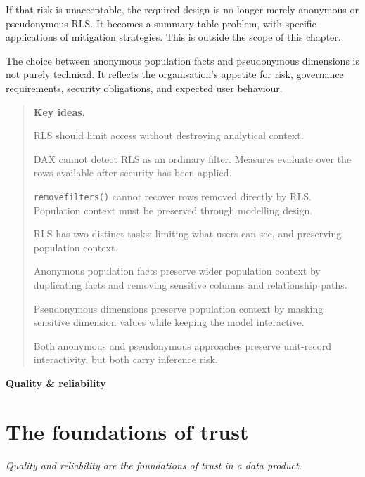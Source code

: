\documentclass[10pt,openany,10pt]{book}
\begin{document}
If that risk is unacceptable, the required design is no longer merely
anonymous or pseudonymous RLS. It becomes a summary-table problem, with
specific applications of mitigation strategies. This is outside the
scope of this chapter.

The choice between anonymous population facts and pseudonymous
dimensions is not purely technical. It reflects the organisation's
appetite for risk, governance requirements, security obligations, and
expected user behaviour.

\begin{quote}
\textbf{Key ideas.}

RLS should limit access without destroying analytical context.

DAX cannot detect RLS as an ordinary filter. Measures evaluate over the
rows available after security has been applied.

\texttt{removefilters()} cannot recover rows removed directly by RLS.
Population context must be preserved through modelling design.

RLS has two distinct tasks: limiting what users can see, and preserving
population context.

Anonymous population facts preserve wider population context by
duplicating facts and removing sensitive columns and relationship paths.

Pseudonymous dimensions preserve population context by masking sensitive
dimension values while keeping the model interactive.

Both anonymous and pseudonymous approaches preserve unit-record
interactivity, but both carry inference risk.
\end{quote}

\newpage

\thispagestyle{empty}
\hypertarget{docs-quality-reliability}{}
\vspace*{0.34\textheight}
\begin{center}
{\Huge\bfseries Quality \& reliability}
\end{center}
\newpage

\chapter{The foundations of
trust}\label{docs-quality-reliability-the-foundations-of-trust}

\emph{Quality and reliability are the foundations of trust in a data
product.}
\end{document}
